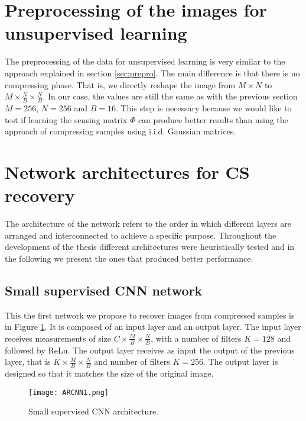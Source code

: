 \FloatBarrier

\section{Preprocessing of the images for unsupervised learning} \label{sec:preproun}
The preprocessing of the data for unsupervised learning is very similar to the approach explained in section \ref{sec:prepro}. The main difference is that there is no compressing phase. That is, we directly reshape the image from $M \times N$ to $M \times \frac{N}{B} \times \frac{N}{B}$. In our case, the values are still the same as with the previous section $M = 256$, $N = 256$ and $B = 16$. This step is necessary because we would like to test if learning the sensing matrix $\Phi$ can produce better results than using the approach of compressing samples using i.i.d. Gaussian matrices.    

\FloatBarrier

\section{Network architectures for CS recovery}
The architecture of the network refers to the order in which different layers are arranged and interconnected to achieve a specific purpose. Throughout the development of the thesis different architectures were heuristically tested and in the following we present the ones that produced better performance.

\FloatBarrier

\subsection{Small supervised CNN network} \label{ch:alphaNet}
This the first network we propose to recover images from compressed samples is in Figure \ref{fig:ARCNNim1}. It is composed of an input layer and an output layer. The input layer receives measurements of size $ C \times \frac{M}{B} \times \frac{N}{B}$, with a number of filters $K=128$ and followed by ReLu. The output layer receives as input the output of the previous layer, that is $K \times \frac{M}{B} \times \frac{N}{B}$ and number of filters $K=256$. The output layer is designed so that it matches the size of the original image.  
\begin{figure}[!htb]
\centering 
\texttt{[image: ARCNN1.png]} 
\caption[Small supervised CNN architecture for recovery ]{Small supervised CNN architecture.}
\label{fig:ARCNNim1} 
\end{figure}

